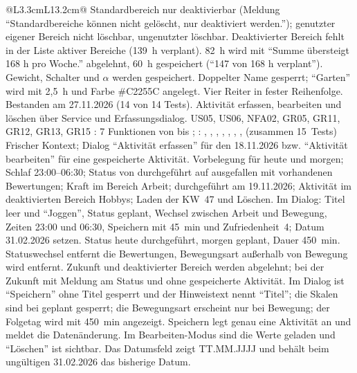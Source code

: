 \begin{longtable}{@{}L{3.3cm}L{13.2cm}@{}}
    {Standardbereich nur deaktivierbar (Meldung \enquote{Standardbereiche können nicht gelöscht, nur deaktiviert werden.}); genutzter eigener Bereich nicht löschbar, ungenutzter löschbar. Deaktivierter Bereich fehlt in der Liste aktiver Bereiche (139~h verplant). 82~h wird mit \enquote{Summe übersteigt 168 h pro Woche.} abgelehnt, 60~h gespeichert (\enquote{147 von 168 h verplant}). Gewicht, Schalter und $\alpha$ werden gespeichert. Doppelter Name gesperrt; \enquote{Garten} wird mit 2,5~h und Farbe \#C2255C angelegt. Vier Reiter in fester Reihenfolge.}
    {Bestanden am 27.11.2026 (14 von 14 Tests).}
  \midrule
    {Aktivität erfassen, bearbeiten und löschen über Service und Erfassungsdialog.}
    {US05, US06, NFA02, GR05, GR11, GR12, GR13, GR15}
    {: 7 Funktionen von  bis ; : , , , , , , ,  (zusammen 15~Tests)}
    {Frischer Kontext; Dialog \enquote{Aktivität erfassen} für den 18.11.2026 bzw. \enquote{Aktivität bearbeiten} für eine gespeicherte Aktivität.}
    {Vorbelegung für heute und morgen; Schlaf 23:00--06:30; Status von durchgeführt auf ausgefallen mit vorhandenen Bewertungen; Kraft im Bereich Arbeit; durchgeführt am 19.11.2026; Aktivität im deaktivierten Bereich Hobbys; Laden der KW~47 und Löschen. Im Dialog: Titel leer und \enquote{Joggen}, Status geplant, Wechsel zwischen Arbeit und Bewegung, Zeiten 23:00 und 06:30, Speichern mit 45~min und Zufriedenheit~4; Datum 31.02.2026 setzen.}
    {Status heute durchgeführt, morgen geplant, Dauer 450~min. Statuswechsel entfernt die Bewertungen, Bewegungsart außerhalb von Bewegung wird entfernt. Zukunft und deaktivierter Bereich werden abgelehnt; bei der Zukunft mit Meldung am Status und ohne gespeicherte Aktivität. Im Dialog ist \enquote{Speichern} ohne Titel gesperrt und der Hinweistext nennt \enquote{Titel}; die Skalen sind bei geplant gesperrt; die Bewegungsart erscheint nur bei Bewegung; der Folgetag wird mit 450~min angezeigt. Speichern legt genau eine Aktivität an und meldet die Datenänderung. Im Bearbeiten-Modus sind die Werte geladen und \enquote{Löschen} ist sichtbar. Das Datumsfeld zeigt TT.MM.JJJJ und behält beim ungültigen 31.02.2026 das bisherige Datum.}

\end{longtable}
